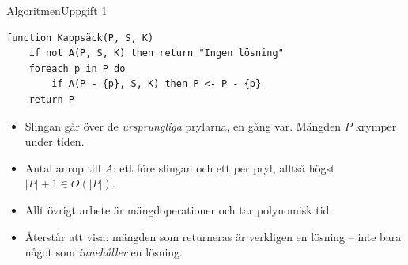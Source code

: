 \documentclass[aspectratio=169,10pt]{beamer}
\begin{document}
\begin{frame}[fragile]{Algoritmen}{Uppgift 1}
\begin{lstlisting}
function Kappsäck(P, S, K)
    if not A(P, S, K) then return "Ingen lösning"
    foreach p in P do
        if A(P - {p}, S, K) then P <- P - {p}
    return P
\end{lstlisting}
  \begin{itemize}
    \item<2-> Slingan går över de \emph{ursprungliga} prylarna, en gång var. Mängden $P$ krymper under tiden.
    \item<3-> Antal anrop till $A$: ett före slingan och ett per pryl, alltså högst $|P|+1\in O(|P|)$.
    \item<4-> Allt övrigt arbete är mängdoperationer och tar polynomisk tid.
    \item<5-> Återstår att visa: mängden som returneras är verkligen en lösning -- inte bara något som \emph{innehåller} en lösning.
  \end{itemize}
\end{frame}
\end{document}

